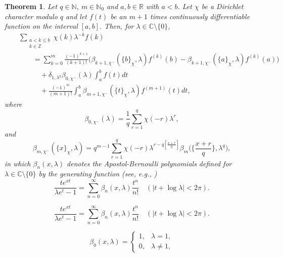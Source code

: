 \documentclass[10pt,a4paper]{amsart}
\newtheorem{theorem}{Theorem}
\begin{document}
\begin{theorem}\label{thm2.1} Let $q\in\mathbb{N}$, $m\in\mathbb{N}_{0}$ and $a,b\in\mathbb{R}$ with $a<b$. Let $\chi$ be a Dirichlet character modulo $q$ and let $f(t)$ be an $m+1$
times continuously differentiable function on the interval $[a,b]$. Then, for $\lambda\in\mathbb{C}\setminus\{0\}$,
\begin{eqnarray}\label{eq2.1}
&&\sum_{\substack{a<k\leqslant b\\k\in\mathbb{Z}}}\chi(k)\lambda^{-k}f(k)\nonumber\\
&&\qquad=\sum_{k=0}^{m}\frac{(-1)^{k+1}}{(k+1)!}\bigl(\beta_{k+1,\chi^{-}}(\{b\}_{\chi},\lambda)f^{(k)}(b)-\beta_{k+1,\chi^{-}}(\{a\}_{\chi},\lambda)f^{(k)}(a)\bigl)\nonumber\\
&&\qquad\quad+\delta_{1,\lambda^{q}}\beta_{0,\chi^{-}}(\lambda)\int_{a}^{b}f(t)dt\nonumber\\
&&\qquad\quad+\frac{(-1)^{m}}{(m+1)!}\int_{a}^{b}\beta_{m+1,\chi^{-}}(\{t\}_{\chi},\lambda)f^{(m+1)}(t)dt,
\end{eqnarray}
where
\begin{equation*}
\beta_{0,\chi^{-}}(\lambda)=\frac{1}{q}\sum_{r=1}^{q}\chi(-r)\lambda^{r},
\end{equation*}
and
\begin{equation*}
\beta_{m,\chi^{-}}(\{x\}_{\chi},\lambda)=q^{m-1}\sum_{r=1}^{q}\chi(-r)\lambda^{r-q[\frac{x+r}{q}]}\beta_{m}\biggl(\biggl\{\frac{x+r}{q}\biggl\},\lambda^{q}\biggl),
\end{equation*}
in which $\beta_{n}(x,\lambda)$ denotes the Apostol-Bernoulli polynomials defined for $\lambda\in\mathbb{C}\setminus\{0\}$ by the generating function (see, e.g., \cite{apostol2})
\begin{equation}\label{eq2.2}
\frac{te^{xt}}{\lambda e^{t}-1}=\sum_{n=0}^{\infty}
\beta_{n}(x,\lambda)\frac{t^{n}}{n!}\quad(|t+\log\lambda|<2\pi).
\end{equation}
\end{theorem}

\begin{equation}
\frac{te^{xt}}{\lambda e^{t}-1}=\sum_{n=0}^{\infty}
\beta_{n}(x,\lambda)\frac{t^{n}}{n!}\quad(|t+\log\lambda|<2\pi).
\end{equation}

\begin{equation}\label{eq2.10}
\beta_{0}(x,\lambda)=\begin{cases}
1,  &\lambda=1,\\
0,  &\lambda\not=1,
\end{cases}
\end{equation}
\end{document}
